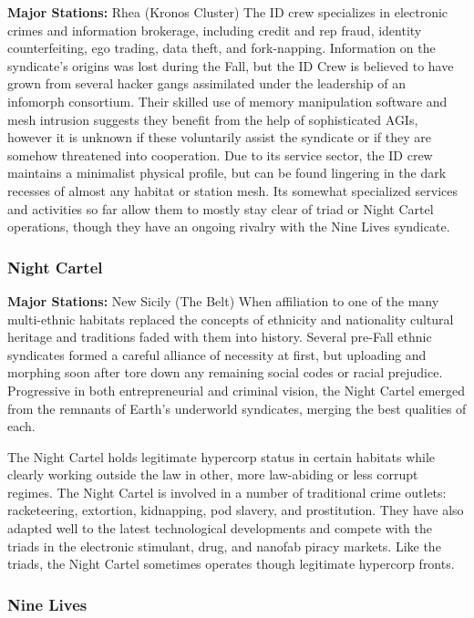 \textbf{Major Stations:} Rhea (Kronos Cluster)
The ID crew specializes in electronic crimes and information
brokerage, including credit and rep fraud,
identity counterfeiting, ego trading, data theft, and 
fork-napping. Information on the syndicate's origins 
was lost during the Fall, but the ID Crew is believed 
to have grown from several hacker gangs assimilated 
under the leadership of an infomorph consortium. 
Their skilled use of memory manipulation software 
and mesh intrusion suggests they benefit from the 
help of sophisticated AGIs, however it is unknown 
if these voluntarily assist the syndicate or if they are 
somehow threatened into cooperation. Due to its 
service sector, the ID crew maintains a minimalist 
physical profile, but can be found lingering in the 
dark recesses of almost any habitat or station mesh. 
Its somewhat specialized services and activities so 
far allow them to mostly stay clear of triad or Night 
Cartel operations, though they have an ongoing rivalry
with the Nine Lives syndicate.

\subsubsection{Night Cartel}

\textbf{Major Stations:} New Sicily (The Belt)
When affiliation to one of the many multi-ethnic 
habitats replaced the concepts of ethnicity and nationality
cultural heritage and traditions faded with
them into history. Several pre-Fall ethnic syndicates 
formed a careful alliance of necessity at first,  but 
uploading and morphing soon after tore down any 
remaining social codes or racial prejudice. Progressive
in both entrepreneurial and criminal vision, the
Night Cartel emerged from the remnants of Earth's 
underworld syndicates, merging the best qualities 
of each.

The Night Cartel holds legitimate hypercorp status 
in certain habitats while clearly working outside 
the law in other, more law-abiding or less corrupt 
regimes. The Night Cartel is involved in a number 
of traditional crime outlets: racketeering, extortion, 
kidnapping, pod slavery, and prostitution. They have 
also adapted well to the latest technological developments
and compete with the triads in the electronic
stimulant, drug, and nanofab piracy markets. Like the 
triads, the Night Cartel sometimes operates though 
legitimate hypercorp fronts.

\subsubsection{Nine Lives}

